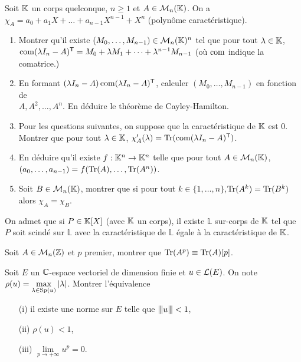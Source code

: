 \begin{exercise}
	Soit $\mathbb{K}$ un corps quelconque, $n\geqslant1$ et $A\in\mathcal{M}_{n}(\mathbb{K})$. On a $\chi_{A}=a_{0}+a_{1}X+\dots+a_{n-1}X^{n-1}+X^{n}$ (polynôme caractéristique).
	\begin{enumerate}
		\item Montrer qu'il existe $(M_{0},\dots,M_{n-1})\in\mathcal{M}_{n}(\mathbb{K})^{n}$ tel que pour tout $\lambda\in\mathbb{K}$, $\operatorname{com}(\lambda I_{n}-A)^{\mathsf{T}}=M_{0}+\lambda M_{1}+\dots+\lambda^{n-1}M_{n-1}$ (où $\operatorname{com}$ indique la comatrice.)
		\item En formant $(\lambda I_{n}-A)\operatorname{com}(\lambda I_{n}-A)^{\mathsf{T}}$, calculer $(M_{0},\dots,M_{n-1})$ en fonction de \\$A,A^{2},\dots,A^{n}$. En déduire le théorème de Cayley-Hamilton.
		\item Pour les questions suivantes, on suppose que la caractéristique de $\mathbb{K}$ est 0. Montrer que pour tout $\lambda\in\mathbb{K}$, $\chi_{A}'(\lambda)=\operatorname{Tr}(\operatorname{com}(\lambda I_{n}-A)^{\mathsf{T}})$.
		\item En déduire qu'il existe $f:\mathbb{K}^{n}\to\mathbb{K}^{n}$ telle que pour tout $A\in\mathcal{M}_{n}(\mathbb{K})$, $(a_{0},\dots,a_{n-1}) = f(\operatorname{Tr}(A),\dots,\operatorname{Tr}(A^{n}))$.
		\item Soit $B\in\mathcal{M}_{n}(\mathbb{K})$, montrer que si pour tout $k\in\{1,\dots,n\}$,$\operatorname{Tr}(A^{k})=\operatorname{Tr}(B^{k})$ alors $\chi_{A}=\chi_{B}$.
	\end{enumerate}
\end{exercise}

\begin{exercise}
	On admet que si $P\in\mathbb{K}[X]$ (avec $\mathbb{K}$ un corps), il existe $\mathbb{L}$ sur-corps de $\mathbb{K}$ tel que $P$ soit scindé sur $\mathbb{L}$ avec la caractéristique de $\mathbb{L}$ égale à la caractéristique de $\mathbb{K}$.

	Soit $A\in\mathcal{M}_{n}(\mathbb{Z})$ et $p$ premier, montrer que $\operatorname{Tr}(A^{p})\equiv\operatorname{Tr}(A)[p]$.
\end{exercise}

\begin{exercise}
	Soit $E$ un $\mathbb{C}$-espace vectoriel de dimension finie et $u\in\mathcal{L}(E)$. On note $\rho(u)=\max\limits_{\lambda\in\operatorname{Sp}(u)}\vert \lambda\vert$. Montrer l'équivalence
	\begin{enumerate}
		\item [(i)] il existe une norme sur $E$ telle que ${\left\vert\kern-0.25ex\left\vert\kern-0.25ex\left\vert{}u \right\vert\kern-0.25ex\right\vert\kern-0.25ex\right\vert}<1$,
		\item [(ii)] $\rho(u)<1$,
		\item [(iii)] $\lim\limits_{p\to+\infty}u^{p}=0$.
	\end{enumerate}
\end{exercise}

